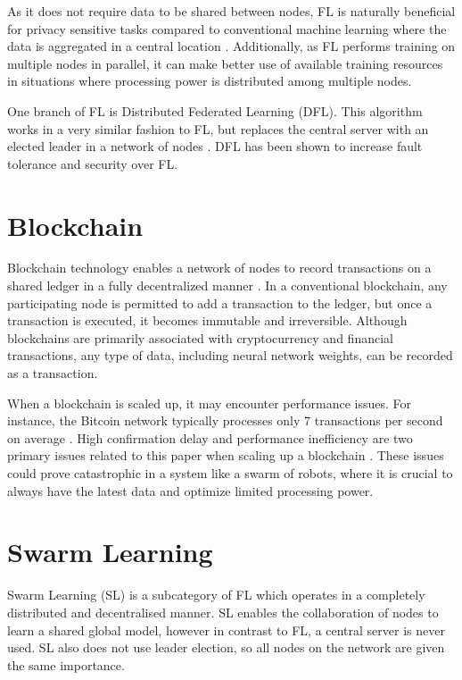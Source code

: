 As it does not require data to be shared between nodes, FL is naturally beneficial for privacy sensitive tasks compared to conventional machine learning where the data is aggregated in a central location \cite{fed_privacy}. Additionally, as FL performs training on multiple nodes in parallel, it can make better use of available training resources in situations where processing power is distributed among multiple nodes.

One branch of FL is Distributed Federated Learning (DFL). This algorithm works in a very similar fashion to FL, but replaces the central server with an elected leader in a network of nodes \cite{leaderelec_car}. DFL has been shown to increase fault tolerance and security over FL.

\section{Blockchain} \label{bg:bc}
Blockchain technology enables a network of nodes to record transactions on a shared ledger in a fully decentralized manner \cite{blockchain_review}. In a conventional blockchain, any participating node is permitted to add a transaction to the ledger, but once a transaction is executed, it becomes immutable and irreversible. Although blockchains are primarily associated with cryptocurrency and financial transactions, any type of data, including neural network weights, can be recorded as a transaction.

When a blockchain is scaled up, it may encounter performance issues. For instance, the Bitcoin network typically processes only 7 transactions per second on average \cite{blockchain_scale}. High confirmation delay and performance inefficiency are two primary issues related to this paper when scaling up a blockchain \cite{blockchain_scale}. These issues could prove catastrophic in a system like a swarm of robots, where it is crucial to always have the latest data and optimize limited processing power.

\section{Swarm Learning}
Swarm Learning (SL) is a subcategory of FL which operates in a completely distributed and decentralised manner. SL enables the collaboration of nodes to learn a shared global model, however in contrast to FL, a central server is never used. SL also does not use leader election, so all nodes on the network are given the same importance.

